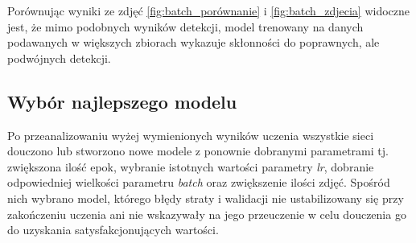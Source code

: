 \hspace{0.5cm}
Porównując wyniki ze zdjęć \ref{fig:batch_porównanie} i \ref{fig:batch_zdjecia} widoczne jest, że mimo podobnych wyników detekcji, model trenowany na danych podawanych w większych zbiorach wykazuje skłonności do poprawnych, ale podwójnych detekcji.

\subsection{Wybór najlepszego modelu}
\label{najlepszy}

\hspace{0.5cm}
Po przeanalizowaniu wyżej wymienionych wyników uczenia wszystkie sieci douczono lub stworzono nowe modele z ponownie dobranymi parametrami tj. zwiększona ilość epok, wybranie istotnych wartości parametry \emph{lr}, dobranie odpowiedniej wielkości parametru \emph{batch} oraz zwiększenie ilości zdjęć. Spośród nich wybrano model, którego błędy straty i walidacji nie ustabilizowany się przy zakończeniu uczenia ani nie wskazywały na jego przeuczenie w celu douczenia go do uzyskania satysfakcjonujących wartości.

